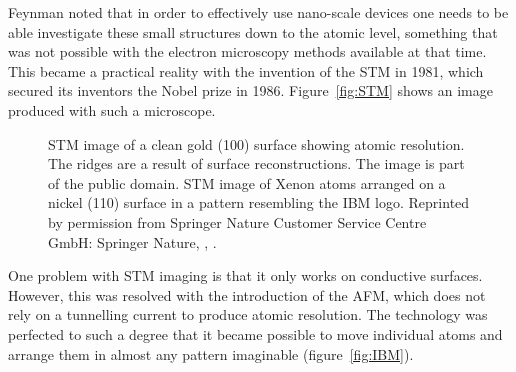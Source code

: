 Feynman noted that in order to effectively use nano-scale devices one needs to be
able investigate these small structures down to the atomic level, something that
was not possible with the electron microscopy methods available at that time.
This became a practical reality with the invention of the \ac{STM} in
1981,\autocite{Binnig_ScanningTunnelingMicroscopy_1986} which secured its
inventors the Nobel prize in 1986. Figure~\ref{fig:STM} shows an image produced
with such a microscope.
%
\begin{figure}[htb]
    \centering
    \hspace{0.05\textwidth}
    \caption{\protect{} \acs{STM} image of a clean gold (100) surface showing atomic resolution. The ridges are a result of surface reconstructions. The image is part of the public domain. \protect{} \acs{STM} image of Xenon atoms arranged on a nickel (110) surface in a pattern resembling the IBM logo. Reprinted by permission from Springer Nature Customer Service Centre GmbH: Springer Nature, \autocite{Eigler_Positioningsingleatoms_1990a}, .}
    \label{fig:STMexamples}
\end{figure}
%
One problem with \ac{STM} imaging is that it only works on conductive surfaces.
However, this was resolved with the introduction of the \ac{AFM}, which does not
rely on a tunnelling current to produce atomic
resolution.\autocite{Binnig_AtomicForceMicroscope_1986} The technology was
perfected to such a degree that it became possible to move individual atoms and
arrange them in almost any pattern imaginable
(figure~\ref{fig:IBM}).\autocite{Eigler_Positioningsingleatoms_1990a}


